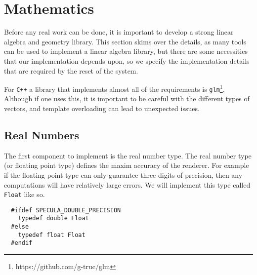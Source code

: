 \documentclass[../specula.tex]{subfiles}
\begin{document}
\section{Mathematics}%
\label{sec:mathematics}

Before any real work can be done, it is important to develop a strong linear
algebra and geometry library. This section skims over the details, as many
tools can be used to implement a linear algebra library, but there are some
necessities that our implementation depends upon, so we specify the
implementation details that are required by the reset of the system.

For \texttt{C++} a library that implements almost all of the requirements is
\texttt{glm}\footnote{https://github.com/g-truc/glm}. Although if one uses
this, it is important to be careful with the different types of vectors, and
template overloading can lead to unexpected issues.

\subsection{Real Numbers}%
\label{sub:Real Numbers}

The first component to implement is the real number type. The real number type
(or floating point type) defines the maxim accuracy of the renderer. For
example if the floating point type can only guarantee three digits of
precision, then any computations will have relatively large errors. We will
implement this type called \texttt{Float} like so.

\begin{verbatim}
  #ifdef SPECULA_DOUBLE_PRECISION
    typedef double Float
  #else
    typedef float Float
  #endif
\end{verbatim}
\end{document}
